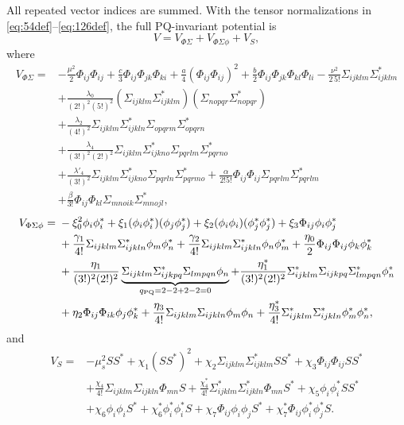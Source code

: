 \documentclass[11pt]{article}
\begin{document}
All repeated vector indices are summed.  With the tensor normalizations in
\eqref{eq:54def}--\eqref{eq:126def}, the full PQ-invariant potential is
\begin{equation}
 V=V_{\Phi\Sigma}+V_{\Phi\Sigma\phi}+V_S,
 \label{eq:potential-split}
\end{equation}
where
\begin{align}
V_{\Phi\Sigma}={}&-\frac{\mu^2}{2}\Phi_{ij}\Phi_{ij}
 +\frac c3\Phi_{ij}\Phi_{jk}\Phi_{ki}
 +\frac a4(\Phi_{ij}\Phi_{ij})^2
 +\frac b2\Phi_{ij}\Phi_{jk}\Phi_{kl}\Phi_{li}
 -\frac{\nu^2}{2\,5!}\Sigma_{ijklm}\Sigma^*_{ijklm}\nonumber\\
&+\frac{\lambda_0}{(2!)^2(5!)^2}
 (\Sigma_{ijklm}\Sigma^*_{ijklm})
 (\Sigma_{nopqr}\Sigma^*_{nopqr})\nonumber\\
&+\frac{\lambda_2}{(4!)^2}
 \Sigma_{ijklm}\Sigma^*_{ijkln}
 \Sigma_{opqrm}\Sigma^*_{opqrn}\nonumber\\
&+\frac{\lambda_4}{(3!)^2(2!)^2}
 \Sigma_{ijklm}\Sigma^*_{ijkno}
 \Sigma_{pqrlm}\Sigma^*_{pqrno}\nonumber\\
&+\frac{\lambda'_4}{(3!)^2}
 \Sigma_{ijklm}\Sigma^*_{ijkno}
 \Sigma_{pqrln}\Sigma^*_{pqrmo}
 +\frac{\alpha}{2!5!}\Phi_{ij}\Phi_{ij}
 \Sigma_{pqrlm}\Sigma^*_{pqrlm}\nonumber\\
&+\frac\beta{3!}\Phi_{ij}\Phi_{kl}
 \Sigma_{mnoik}\Sigma^*_{mnojl},
\label{eq:Vphisigma}
\end{align}
\begin{align}
V_{\Phi\Sigma\phi}={}&-\xi_0^2\phi_i\phi_i^*
 +\xi_1(\phi_i\phi_i^*)(\phi_j\phi_j^*)
 +\xi_2(\phi_i\phi_i)(\phi_j^*\phi_j^*)
 +\xi_3\Phi_{ij}\phi_i\phi_j^*\nonumber\\
&+\frac{\gamma_1}{4!}\Sigma_{ijklm}\Sigma^*_{ijkln}
 \phi_m\phi_n^*
 +\frac{\gamma_2}{4!}\Sigma_{ijklm}\Sigma^*_{ijkln}
 \phi_n\phi_m^*
 +\frac{\eta_0}{2}\Phi_{ij}\Phi_{ij}\phi_k\phi_k^*\nonumber\\
&+\frac{\eta_1}{(3!)^2(2!)^2}
 \underbrace{\Sigma_{ijklm}\Sigma^*_{ijkpq}
 \Sigma_{lmpqn}\phi_n}_{q_{\rm PQ}=2-2+2-2=0}
 +\frac{\eta_1^*}{(3!)^2(2!)^2}
 \Sigma^*_{ijklm}\Sigma_{ijkpq}\Sigma^*_{lmpqn}\phi_n^*\nonumber\\
&+\eta_2\Phi_{ij}\Phi_{ik}\phi_j\phi_k^*
 +\frac{\eta_3}{4!}\Sigma_{ijklm}\Sigma_{ijkln}\phi_m\phi_n
 +\frac{\eta_3^*}{4!}\Sigma^*_{ijklm}\Sigma^*_{ijkln}
 \phi_m^*\phi_n^*,
\label{eq:Vmix}
\end{align}
and
\begin{align}
V_S={}&-\mu_s^2SS^*+\chi_1(SS^*)^2
 +\chi_2\Sigma_{ijklm}\Sigma^*_{ijklm}SS^*
 +\chi_3\Phi_{ij}\Phi_{ij}SS^*\nonumber\\
&+\frac{\chi_4}{4!}\Sigma_{ijklm}\Sigma_{ijkln}\Phi_{mn}S
 +\frac{\chi_4^*}{4!}\Sigma^*_{ijklm}\Sigma^*_{ijkln}\Phi_{mn}S^*
 +\chi_5\phi_i\phi_i^*SS^*\nonumber\\
&+\chi_6\phi_i\phi_iS^*+\chi_6^*\phi_i^*\phi_i^*S
+\chi_7\Phi_{ij}\phi_i\phi_jS^*
+\chi_7^*\Phi_{ij}\phi_i^*\phi_j^*S.
\label{eq:VS}
\end{align}
\end{document}
